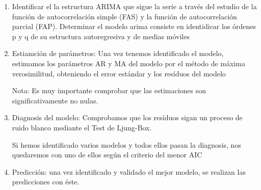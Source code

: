 \documentclass[12pt,a4paper,]{book}
\numberwithin{dummy}{section}
\theoremstyle{ocrenumbox}
\theoremstyle{blacknumex}
\theoremstyle{blacknumbox}
\theoremstyle{ocrenum}
\theoremstyle{ocrenum}
\begin{document}
\begin{enumerate}
\def\labelenumi{\arabic{enumi}.}
\item
  Identificar el la estructura ARIMA que sigue la serie a través del
  estudio de la función de autocorrelación simple (FAS) y la función de
  autocorrelación parcial (FAP). Determinar el modelo arima consiste en
  identidicar los órdenes p y q de su estructura autoregresiva y de
  medias móviles
\item
  Estiamción de parámetros: Una vez tenemos identificado el modelo,
  estimamos los parámetros AR y MA del modelo por el método de máxima
  verosimilitud, obteniendo el error estándar y los resíduos del modelo

  Nota: Es muy importante comprobar que las estimaciones son
  significativamente no nulas.
\item
  Diagnosis del modelo: Comprobamos que los resíduos sigan un proceso de
  ruido blanco mediante el Test de Ljung-Box.

  Si hemos identificado varios modelos y todos ellos pasan la diagnosis,
  nos quedaremos con uno de ellos según el criterio del menor AIC
\item
  Predicción: una vez identificado y validado el mejor modelo, se
  realizan las predicciones con éste.
\end{enumerate}




\end{document}
